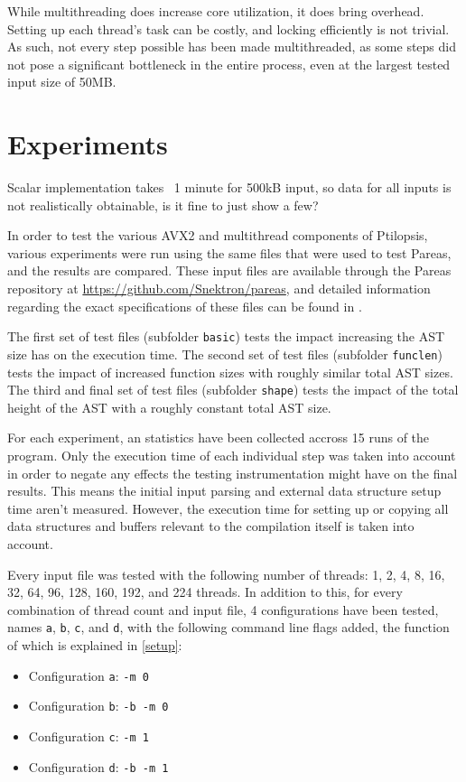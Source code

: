 \documentclass[12pt,dvipsnames]{article}
\newcommand{\helpme}[1]{{\color{red}#1}}
\newcommand{\mono}[1]{\texttt{#1}}
\begin{document}
While multithreading does increase core utilization, it does bring overhead. Setting up each thread's task can be costly, and locking efficiently is not trivial. As such, not every step possible has been made multithreaded, as some steps did not pose a significant bottleneck in the entire process, even at the largest tested input size of 50MB.

\newpage
\section{Experiments} \label{experiments}

\helpme{Scalar implementation takes ~1 minute for 500kB input, so data for all inputs is not realistically obtainable, is it fine  to just show a few?}

In order to test the various AVX2 and multithread components of Ptilopsis, various experiments were run using the same files that were used to test Pareas, and the results are compared. These input files are available through the Pareas repository at \url{https://github.com/Snektron/pareas}, and detailed information regarding the exact specifications of these files can be found in \cite{huijben2021}.

The first set of test files (subfolder \mono{basic}) tests the impact increasing the AST size has on the execution time. The second set of test files (subfolder \mono{funclen}) tests the impact of increased function sizes with roughly similar total AST sizes. The third and final set of test files (subfolder \mono{shape}) tests the impact of the total height of the AST with a roughly constant total AST size.

For each experiment, an statistics have been collected accross 15 runs of the program. Only the execution time of each individual step was taken into account in order to negate any effects the testing instrumentation might have on the final results. This means the initial input parsing and external data structure setup time aren't measured. However, the execution time for setting up or copying all data structures and buffers relevant to the compilation itself is taken into account.

Every input file was tested with the following number of threads: 1, 2, 4, 8, 16, 32, 64, 96, 128, 160, 192, and 224 threads. In addition to this, for every combination of thread count and input file, 4 configurations have been tested, names \mono{a}, \mono{b}, \mono{c}, and \mono{d}, with the following command line flags added, the function of which is explained in \autoref{setup}:
\begin{itemize}
    \item Configuration \mono{a}: \mono{-m 0}
    \item Configuration \mono{b}: \mono{-b -m 0}
    \item Configuration \mono{c}: \mono{-m 1}
    \item Configuration \mono{d}: \mono{-b -m 1}
\end{itemize}
\end{document}
